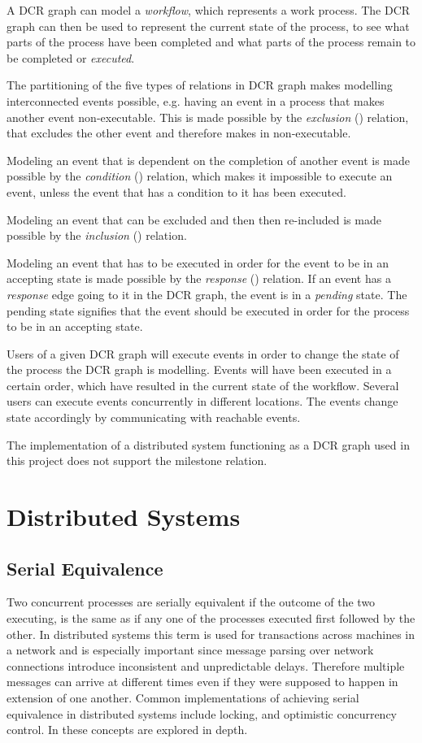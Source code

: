 	A DCR graph can model a \textit{workflow}, which represents a work process. The DCR graph can then be used to represent the current state of the process, to see what parts of the process have been completed and what parts of the process remain to be completed or \textit{executed}. 
	
	The partitioning of the five types of relations in DCR graph makes modelling interconnected events possible, e.g. having an event in a process that makes another event non-executable. This is made possible by the \textit{exclusion} (\exclusion) relation, that excludes the other event and therefore makes in non-executable. 
	
	Modeling an event that is dependent on the completion of another event is made possible by the \textit{condition} (\condition) relation, which makes it impossible to execute an event, unless the event that has a condition to it has been executed.
	
	Modeling an event that can be excluded and then then re-included is made possible by the \textit{inclusion} (\inclusion) relation. 
	
	Modeling an event that has to be executed in order for the event to be in an accepting state  is made possible by the \textit{response} (\response) relation. If an event has a \textit{response} edge going to it in the DCR graph, the event is in a \textit{pending} state. The pending state signifies that the event should be executed in order for the process to be in an accepting state.
	
	Users of a given DCR graph will execute events in order to change the state of the process the DCR graph is modelling. Events will have been executed in a certain order, which have resulted in the current state of the workflow. Several users can execute events concurrently in different locations. The events change state accordingly by communicating with reachable events. 
	
	The implementation of a distributed system functioning as a DCR graph used in this project does not support the milestone relation. 
	
	\section{Distributed Systems}
		\subsection{Serial Equivalence}
		Two concurrent processes are serially equivalent if the outcome of the two executing, is the same as if any one of the processes executed first followed by the other. In distributed systems this term is used for transactions across machines in a network and is especially important since message parsing over network connections introduce inconsistent and unpredictable delays. Therefore multiple messages can arrive at different times even if they were supposed to happen in extension of one another. Common implementations of achieving serial equivalence in distributed systems include locking, and optimistic concurrency control. In \cite{Coulouris:2011:DSC:2029110} these concepts are explored in depth.
		

